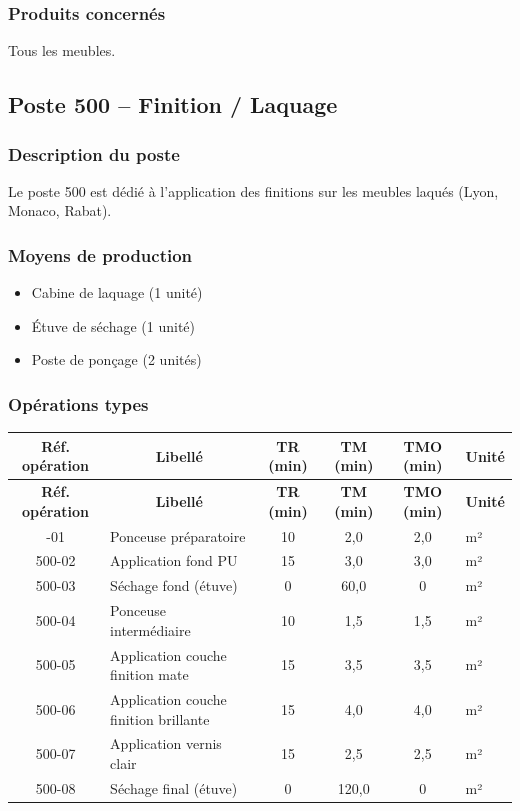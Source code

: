\documentclass[12pt,a4paper]{article}
\begin{document}
\subsubsection{Produits concernés}
Tous les meubles.

\subsection{Poste 500 – Finition / Laquage}

\subsubsection{Description du poste}
Le poste 500 est dédié à l'application des finitions sur les meubles laqués (Lyon, Monaco, Rabat).

\subsubsection{Moyens de production}
\begin{itemize}
    \item Cabine de laquage (1 unité)
    \item Étuve de séchage (1 unité)
    \item Poste de ponçage (2 unités)
\end{itemize}

\subsubsection{Opérations types}

\begin{longtable}{|c|p{5cm}|c|c|c|p{3cm}|}
\hline
\multicolumn{1}{|c|}{\textbf{Réf. opération}} & \multicolumn{1}{c|}{\textbf{Libellé}} & \multicolumn{1}{c|}{\textbf{TR (min)}} & \multicolumn{1}{c|}{\textbf{TM (min)}} & \multicolumn{1}{c|}{\textbf{TMO (min)}} & \multicolumn{1}{c|}{\textbf{Unité}} \\
\hline
\endfirsthead
\hline
\multicolumn{1}{|c|}{\textbf{Réf. opération}} & \multicolumn{1}{c|}{\textbf{Libellé}} & \multicolumn{1}{c|}{\textbf{TR (min)}} & \multicolumn{1}{c|}{\textbf{TM (min)}} & \multicolumn{1}{c|}{\textbf{TMO (min)}} & \multicolumn{1}{c|}{\textbf{Unité}} \\
\hline
\endhead
\hline
\endfoot
500-01 & Ponceuse préparatoire & 10 & 2,0 & 2,0 & m² \\
500-02 & Application fond PU & 15 & 3,0 & 3,0 & m² \\
500-03 & Séchage fond (étuve) & 0 & 60,0 & 0 & m² \\
500-04 & Ponceuse intermédiaire & 10 & 1,5 & 1,5 & m² \\
500-05 & Application couche finition mate & 15 & 3,5 & 3,5 & m² \\
500-06 & Application couche finition brillante & 15 & 4,0 & 4,0 & m² \\
500-07 & Application vernis clair & 15 & 2,5 & 2,5 & m² \\
500-08 & Séchage final (étuve) & 0 & 120,0 & 0 & m² \\
\hline
\end{longtable}
\end{document}

